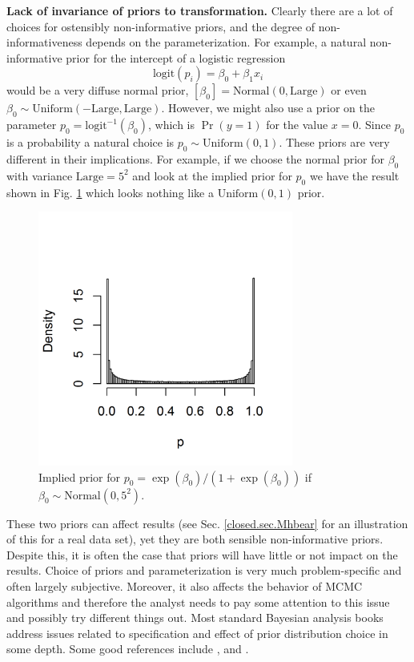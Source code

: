 {\bf Lack of invariance of priors to transformation.} Clearly there
are a lot of choices for ostensibly non-informative priors, and the
degree of non-informativeness depends on the parameterization. For
example, a natural non-informative prior for the intercept of a
logistic regression
\[
\mbox{logit}(p_{i}) = \beta_0 + \beta_1 x_{i}
\]
would be a very diffuse normal prior,
$[\beta_0] = \mbox{Normal}(0,\mbox{Large})$ or even
 $\beta_0 \sim
\mbox{Uniform}(-\mbox{Large},\mbox{Large})$.
However, we might also use a prior on the parameter $p_0
= \mbox{logit}^{-1}(\beta_0)$, which is $\Pr(y=1)$ for the value $x=0$. 
Since $p_0$ is a
probability a natural choice is $p_0 \sim \mbox{Uniform}(0,1)$. 
These priors are very different in their implications. For example, if
we choose the normal prior for $\beta_0$ with variance
$\mbox{Large} = 5^2$ and look at the implied prior for $p_{0}$
we have the result shown in Fig. \ref{glms.fig.impliedprior}
which looks nothing like a $\mbox{Uniform}(0,1)$ prior.
\begin{figure}[htp]
\begin{center}
\includegraphics[height=3.3in]{Ch3-Bayes/figs/implied_prior}
\end{center}
\caption{Implied prior for $p_{0} = \exp(\beta_0)/(1+\exp(\beta_0))$ 
if $\beta_0 \sim \mbox{Normal}(0, 5^2)$.}
\label{glms.fig.impliedprior}
\end{figure}
These two priors can affect results (see Sec. \ref{closed.sec.Mhbear}
for an illustration of this for a real data set), yet they are both
sensible non-informative priors. Despite this, it is often the case
that priors will have little or not impact on the results.
Choice of priors and parameterization
is very much problem-specific and often largely subjective. Moreover,
it also affects the behavior of MCMC algorithms and therefore the
analyst needs to pay some attention to this issue and possibly try
different things out.  Most standard Bayesian analysis books address
issues related to specification and effect of prior distribution
choice in some depth. Some good references include
\citet{kass_wasserman:1996}, \citet{gelman:2006} and
\citet{link_barker:2010}.


